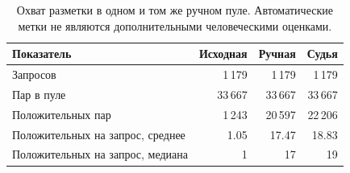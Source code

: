 \begin{table}[t]
\caption{Охват разметки в одном и том же ручном пуле. Автоматические метки не являются дополнительными человеческими оценками.}
\label{tab:annotation-data}
\centering\small
\begin{tabularx}{\textwidth}{@{}Lrrr@{}}
\toprule
Показатель & Исходная & Ручная & Судья \\
\midrule
Запросов & 1\,179 & 1\,179 & 1\,179 \\
Пар в пуле & 33\,667 & 33\,667 & 33\,667 \\
Положительных пар & 1\,243 & 20\,597 & 22\,206 \\
Положительных на запрос, среднее & 1.05 & 17.47 & 18.83 \\
Положительных на запрос, медиана & 1 & 17 & 19 \\
\bottomrule
\end{tabularx}
\end{table}
